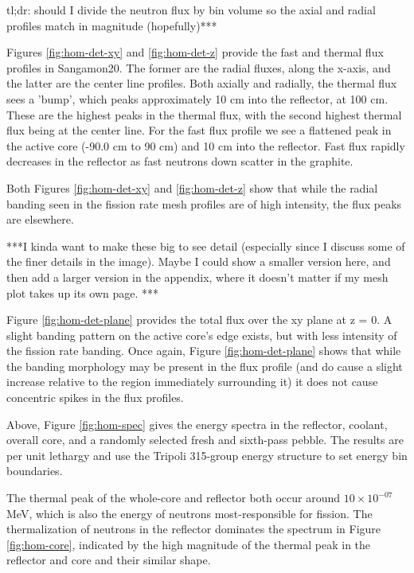tl;dr: should I divide the neutron flux by bin volume so the axial and radial profiles match in magnitude (hopefully)***

Figures \ref{fig:hom-det-xy} and \ref{fig:hom-det-z} provide the fast and thermal flux profiles in Sangamon20.  The former are the radial fluxes, along the x-axis, and the latter are the center line profiles.  Both axially and radially, the thermal flux sees a 'bump', which peaks approximately 10 cm into the reflector, at 100 cm.  These are the highest peaks in the thermal flux, with the second highest thermal flux being at the center line.  For the fast flux profile we see a flattened peak in the  active core (-90.0 cm to 90 cm) and 10 cm into the reflector.  Fast flux rapidly decreases in the reflector as fast neutrons down scatter in the graphite.

Both Figures \ref{fig:hom-det-xy} and \ref{fig:hom-det-z} show that while the radial banding seen in the fission rate mesh profiles are of high intensity, the flux peaks are elsewhere.




***I kinda want to make these big to see detail (especially since I discuss some of the finer details in the image).  Maybe I could show a smaller version here, and then add a larger version in the appendix, where it doesn't matter if my mesh plot takes up its own page. ***

Figure \ref{fig:hom-det-plane} provides the total flux over the xy plane at z = 0.  A slight banding pattern on the active core's edge exists, but with less intensity of the fission rate banding.  Once again, Figure \ref{fig:hom-det-plane} shows that while the banding morphology may be present in the flux profile (and do cause a slight increase relative to the region immediately surrounding it) it does not cause concentric spikes in the flux profiles.



Above, Figure \ref{fig:hom-spec} gives the energy spectra in the reflector, coolant, overall core, and a randomly selected fresh and sixth-pass pebble.  The results are per unit lethargy and use the Tripoli 315-group energy structure to set energy bin boundaries.

The thermal peak of the whole-core and reflector both occur around $10\times10^{-07}$ MeV, which is also the energy of neutrons most-responsible for fission.  The thermalization of neutrons in the reflector dominates the spectrum in Figure \ref{fig:hom-core}, indicated by the high magnitude of the thermal peak in the reflector and core and their similar shape.

